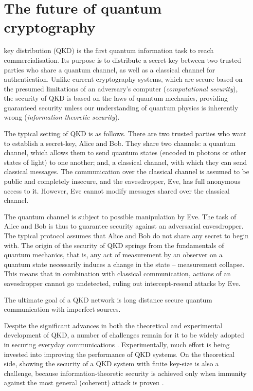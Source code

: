 \section{The future of quantum cryptography}\label{sec:essay_future_QKD}
 
 key distribution (QKD) is the first quantum information task to reach commercialisation. Its purpose is to distribute a secret-key between two trusted parties who share a quantum channel, as well as a classical channel for authentication. Unlike current cryptography systems, which are secure based on the presumed limitations of an adversary's computer (\textit{computational security}), the security of QKD is based on the laws of quantum mechanics, providing guaranteed security unless our understanding of quantum physics is inherently wrong (\textit{information theoretic security}).

The typical setting of QKD is as follows. There are two trusted parties who want to establish a secret-key, Alice and Bob. They share two channels: a quantum channel, which allows them to send quantum states (encoded in photons or other states of light) to one another; and, a classical channel, with which they can send classical messages. The communication over the classical channel is assumed to be public and completely insecure, and the eavesdropper, Eve, has full anonymous access to it. However, Eve cannot modify messages shared over the classical channel.

The quantum channel is subject to possible manipulation by Eve. The task of Alice and Bob is thus to guarantee security against an adversarial eavesdropper. The typical protocol assumes that Alice and Bob do not share any secret to begin with. The origin of the security of QKD springs from the fundamentals of quantum mechanics, that is, any act of measurement by an observer on a quantum state necessarily induces a change in the state -- measurement collapse. This means that in combination with classical communication, actions of an eavesdropper cannot go undetected, ruling out intercept-resend attacks by Eve.

The ultimate goal of a QKD network is long distance secure quantum communication with imperfect sources.

Despite the significant advances in both the theoretical and experimental development of QKD, a number of challenges remain for it to be widely adopted in securing everyday communications \cite{bib:RevModPhys.81.1301, bib:diamanti2016practical}. Experimentally, much effort is being invested into improving the performance of QKD systems. On the theoretical side, showing the security of a QKD system with finite key-size is also a challenge, because information-theoretic security is achieved only when immunity against the most general (coherent) attack is proven \cite{bib:diamanti2016practical}.


